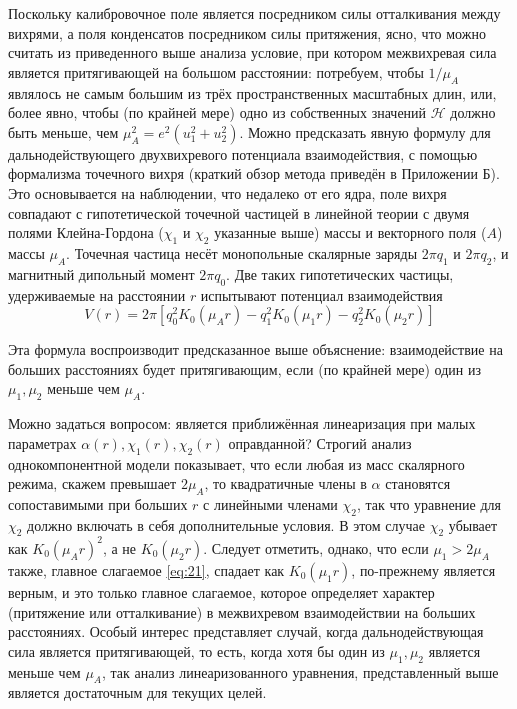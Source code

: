 Поскольку калибровочное поле является посредником силы отталкивания между 
вихрями, а поля конденсатов посредником силы притяжения, ясно, что можно 
считать из приведенного выше анализа условие, при котором межвихревая сила 
является притягивающей на большом расстоянии: потребуем, чтобы \( 1/\mu_A \) 
являлось не самым большим из трёх пространственных масштабных длин, или, 
более явно, чтобы (по крайней мере) одно из собственных значений 
\( \mathcal{H} \) должно быть меньше, чем \( \mu_A^2 = e^2(u_1^2 + u_2^2) \). 
Можно предсказать явную формулу для дальнодействующего двухвихревого 
потенциала взаимодействия, с помощью формализма точечного вихря \cite{bib:19} 
(краткий обзор метода приведён в Приложении Б). Это основывается на 
наблюдении, что недалеко от его ядра, поле вихря совпадают с гипотетической 
точечной частицей в линейной теории с двумя полями Клейна-Гордона 
(\( \chi_1 \) и \( \chi_2 \) указанные выше) массы и векторного поля (\( A \)) 
массы \( \mu_A \). Точечная частица несёт монопольные скалярные заряды 
\( 2\pi q_1 \) и \( 2\pi q_2 \), и магнитный дипольный момент \( 2\pi q_0 \). 
Две таких гипотетических частицы, удерживаемые на расстоянии \( r \) 
испытывают потенциал взаимодействия
\begin{equation}
    V(r) = 2\pi\left[ q_0^2 K_0(\mu_A r) - q_1^2 K_0(\mu_1 r) - 
        q_2^2 K_0(\mu_2 r) \right]
    \label{eq:22}
\end{equation}

Эта формула воспроизводит предсказанное выше объяснение: взаимодействие на 
больших расстояниях будет притягивающим, если (по крайней мере) один из 
\( \mu_1, \mu_2 \) меньше чем \( \mu_A \). 

Можно задаться вопросом: является приближённая линеаризация при малых 
параметрах \( \alpha(r), \chi_1(r), \chi_2(r) \) оправданной? Строгий анализ 
однокомпонентной модели \cite{bib:20} показывает, что если любая из масс 
скалярного режима, скажем превышает \( 2\mu_A \), то квадратичные члены в 
\( \alpha \) становятся сопоставимыми при больших \( r \) с линейными членами 
\( \chi_2 \), так что уравнение для \( \chi_2 \) должно включать в себя 
дополнительные условия. В этом случае \( \chi_2 \) убывает как 
\( K_0(\mu_A r)^2 \), а не \( K_0(\mu_2 r) \). Следует отметить, однако, что 
если \( \mu_1 > 2\mu_A \) также, главное слагаемое \eqref{eq:21}, спадает как 
\( K_0(\mu_1 r) \), по-прежнему является верным, и это только главное 
слагаемое, которое определяет характер (притяжение или отталкивание) в 
межвихревом взаимодействии на больших расстояниях. Особый интерес представляет 
случай, когда дальнодействующая сила является притягивающей, то есть, когда 
хотя бы один из \( \mu_1, \mu_2 \) является меньше чем \( \mu_A \), так 
анализ линеаризованного уравнения, представленный выше является достаточным 
для текущих целей. \cite{bib:main}

\newpage